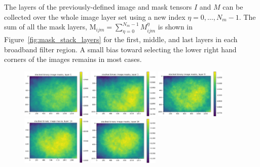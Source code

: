 \documentclass[letterpaper,11pt]{article}
\newcommand{\reffig}[1]{Figure~\ref{#1}}
\newcommand{\Mu}{\mathrm{M}}
\begin{document}
The layers of the previously-defined image and mask tensors $I$ and $M$ can be collected over the whole image layer set using a new index $\eta=0,\ldots,N_{m}-1$. The sum of all the mask layers, $\Mu_{ijm} = \sum_{\eta=0}^{N_{m}-1} M^{\eta}_{ijm}$ is shown in \reffig{fig:mask_stack_layers} for the first, middle, and last layers in each broadband filter region. A small bias toward selecting the lower right hand corners of the images remains in most cases. 

\begin{figure}[!ht]
\centering
\includegraphics[width=0.3\textwidth]{images/measuring_flatfield_corrections/mask_stack_layers/mask_stack_layer_1}
\includegraphics[width=0.3\textwidth]{images/measuring_flatfield_corrections/mask_stack_layers/mask_stack_layer_5}
\includegraphics[width=0.3\textwidth]{images/measuring_flatfield_corrections/mask_stack_layers/mask_stack_layer_9}
\includegraphics[width=0.3\textwidth]{images/measuring_flatfield_corrections/mask_stack_layers/mask_stack_layer_10}
\includegraphics[width=0.3\textwidth]{images/measuring_flatfield_corrections/mask_stack_layers/mask_stack_layer_14}

\end{figure}
\end{document}
